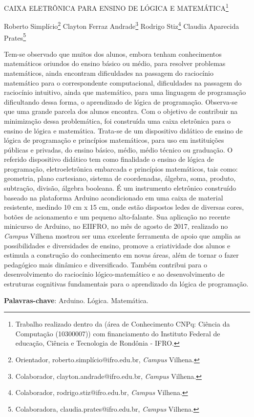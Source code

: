 \documentclass[article,12pt,onesidea,4paper,english,brazil]{abntex2}
\begin{document}
	
	
	\frenchspacing 
	
	\begin{center}
		\LARGE CAIXA ELETRÔNICA PARA ENSINO DE LÓGICA E MATEMÁTICA\footnote{Trabalho realizado dentro da (área de Conhecimento CNPq: Ciência da Computação (10300007))
		com financiamento do Instituto Federal de educação, Ciência e Tecnologia de Rondônia - IFRO.}
		
		\normalsize
		Roberto Simplício\footnote{Orientador, roberto.simplício@ifro.edu.br, \textit{Campus} Vilhena.} 
		Clayton Ferraz Andrade\footnote{Colaborador, clayton.andrade@ifro.edu.br, \textit{Campus} Vilhena.} 
		Rodrigo Stiz\footnote{Colaborador, rodrigo.stiz@ifro.edu.br, \textit{Campus} Vilhena.} 
		Claudia Aparecida Prates\footnote{Colaboradora, claudia.prates@ifro.edu.br, \textit{Campus} Vilhena.} 
	\end{center}
	
	\noindent Tem-se observado que muitos dos alunos, embora tenham conhecimentos
	matemáticos oriundos do ensino básico ou médio, para resolver problemas
	matemáticos, ainda encontram dificuldades na passagem do raciocínio matemático
	para o correspondente computacional, dificuldades na passagem do raciocínio
	intuitivo, ainda que matemático, para uma linguagem de programação dificultando
	dessa forma, o aprendizado de lógica de programação. Observa-se que uma grande
	parcela dos alunos encontra. Com o objetivo de contribuir na minimização dessa
	problemática, foi construída uma caixa eletrônica para o ensino de lógica e
	matemática. Trata-se de um dispositivo didático de ensino de lógica de programação
	e princípios matemáticos, para uso em instituições públicas e privadas, do ensino
	básico, médio, médio técnico ou graduação. O referido dispositivo didático tem como
	finalidade o ensino de lógica de programação, eletroeletrônica embarcada e
	princípios matemáticos, tais como: geometria, plano cartesiano, sistema de
	coordenadas, álgebra, soma, produto, subtração, divisão, álgebra booleana. É um
	instrumento eletrônico construído baseado na plataforma Arduino acondicionado em
	uma caixa de material resistente, medindo 10 cm x 15 cm, onde estão dispostos
	ledes de diversas cores, botões de acionamento e um pequeno alto-falante. Sua
	aplicação no recente minicurso de Arduino, no EIIFRO, no mês de agosto de 2017,
	realizado no \textit{Campus} Vilhena mostrou ser uma excelente ferramenta de apoio que
	amplia as possibilidades e diversidades de ensino, promove a criatividade dos
	alunos e estimula a construção do conhecimento em novas áreas, além de tornar o
	fazer pedagógico mais dinâmico e diversificado. Também contribui para o
	desenvolvimento do raciocínio lógico-matemático e ao desenvolvimento de
	estruturas cognitivas fundamentais para o aprendizado da lógica de programação.
	
	\vspace{\onelineskip}
	
	\noindent
	\textbf{Palavras-chave}: Arduino. Lógica. Matemática.
	
\end{document}
